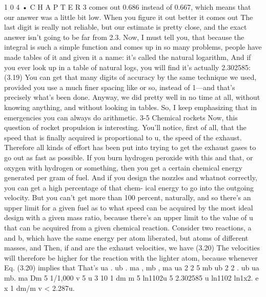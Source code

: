\documentclass[10pt,oneside]{article}
\begin{document}
1 0 4 • C H A P T E R  3 comes out 0.686 instead of 0.667, which means that our answer was a little bit low. When you figure it out better it comes out The last digit is really not reliable, but our estimate is pretty close, and the exact answer isn’t going to be far from 2.3. Now, I must tell you, that because the integral is such a simple function and comes up in so many problems, people have made tables of it and given it a name: it’s called the natural logarithm, And if you ever look up in a table of natural logs, you will find it’s actually 2.302585: (3.19) You can get that many digits of accuracy by the same technique we used, provided you use a much finer spacing like or so, instead of 1---and that’s precisely what’s been done. Anyway, we did pretty well in no time at all, without knowing anything, and without looking in tables. So, I keep emphasizing that in emergencies you can always do arithmetic. 3-5 Chemical rockets Now, this question of rocket propulsion is interesting. You’ll notice, first of all, that the speed that is finally acquired is proportional to u, the speed of the exhaust. Therefore all kinds of effort has been put into trying to get the exhaust gases to go out as fast as possible. If you burn hydrogen peroxide with this and that, or oxygen with hydrogen or something, then you get a certain chemical energy generated per gram of fuel. And if you design the nozzles and whatnot correctly, you can get a high percentage of that chem- ical energy to go into the outgoing velocity. But you can’t get more than 100 percent, naturally, and so there’s an upper limit for a given fuel as to what speed can be acquired by the most ideal design with a given mass ratio, because there’s an upper limit to the value of u that can be acquired from a given chemical reaction. Consider two reactions, a and b, which have the same energy per atom liberated, but atoms of different masses, and Then, if and are the exhaust velocities, we have (3.20) The velocities will therefore be higher for the reaction with the lighter atom, because whenever Eq. (3.20) implies that That’s ua . ub . ma , mb , ma ua 2 2 5 mb ub 2 2 . ub ua mb. ma Dm 5 1/1,000 v 5 u 3 10 1 dm m 5 ln1102u 5 2.302585 u ln1102 ln1x2. e x 1 dm/m v < 2.287u.\par
\end{document}
